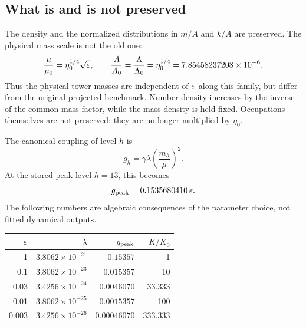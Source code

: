 \documentclass[11pt]{article}
\theoremstyle{definition}\newtheorem{definition}[theorem]{Definition}
\begin{document}
\subsection{What is and is not preserved}
The density and the normalized distributions in $m/A$ and $k/A$ are preserved. The physical mass scale is not the old one:
\begin{equation}
 \frac\mu{\mu_0}=\eta_0^{1/4}\sqrt{\varepsilon},\qquad
 \frac A{A_0}=\frac\Lambda{\Lambda_0}=\eta_0^{1/4}
 =7.85458237208\times10^{-6}.
 \label{eq:physicalscale}
\end{equation}
Thus the physical tower masses are independent of $\varepsilon$ along this family, but differ from the original projected benchmark. Number density increases by the inverse of the common mass factor, while the mass density is held fixed. Occupations themselves are not preserved: they are no longer multiplied by $\eta_0$.

The canonical coupling of level $h$ is
\begin{equation}
 g_h=\gamma\lambda\left(\frac{m_h}{\mu}\right)^2.
\end{equation}
At the stored peak level $h=13$, this becomes
\begin{equation}
 g_{\rm peak}=0.1535680410\,\varepsilon.
\end{equation}
The following numbers are algebraic consequences of the parameter choice, not fitted dynamical outputs.

\begin{center}\small
\begin{tabular}{@{}rrrr@{}}\toprule
$\varepsilon$ & $\lambda$ & $g_{\rm peak}$ & $K/K_0$\\\midrule
1 & $3.8062\times10^{-21}$ & $0.15357$ & 1\\
0.1 & $3.8062\times10^{-23}$ & $0.015357$ & 10\\
0.03 & $3.4256\times10^{-24}$ & $0.0046070$ & $33.333$\\
0.01 & $3.8062\times10^{-25}$ & $0.0015357$ & 100\\
0.003 & $3.4256\times10^{-26}$ & $0.00046070$ & $333.333$\\
\bottomrule\end{tabular}
\end{center}
\end{document}
